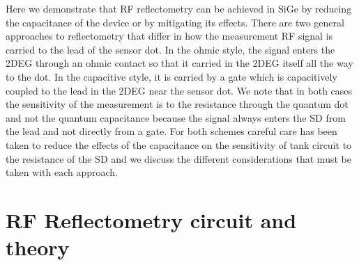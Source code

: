 \documentclass{article}
\begin{document}
	Here we demonstrate that RF reflectometry can be achieved in SiGe by reducing the capacitance of the device or by mitigating its effects.  There are two general approaches to reflectometry that differ in how the measurement RF signal is carried to the lead of the sensor dot.  In the ohmic style, the signal enters the 2DEG through an ohmic contact so that it carried in the 2DEG itself all the way to the dot.  In the capacitive style, it is carried by a gate which is capacitively coupled to the lead in the 2DEG near the sensor dot.  We note that in both cases the sensitivity of the measurement is to the resistance through the quantum dot and not the quantum capacitance because the signal always enters the SD from the lead and not directly from a gate.  For both schemes careful care has been taken to reduce the effects of the capacitance on the sensitivity of tank circuit to the resistance of the SD and we discuss the different considerations that must be taken with each approach. 

\section{RF Reflectometry circuit and theory} %
\label{sec:rf_reflectometry_circuit_and_theory}
\end{document}
